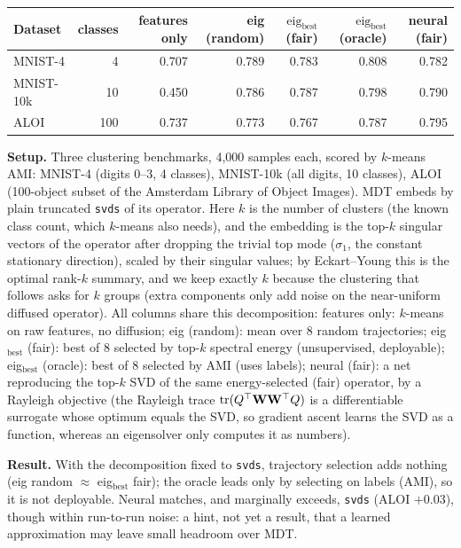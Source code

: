 \begingroup\centering\footnotesize
\begin{tabular}{l r r r r r r}
\toprule
Dataset & classes & features only & eig (random) & $\text{eig}_{\text{best}}$ (fair) & $\text{eig}_{\text{best}}$ (oracle) & neural (fair)\\
\midrule
MNIST-4   & 4   & 0.707 & 0.789 & 0.783 & 0.808 & 0.782\\
MNIST-10k & 10  & 0.450 & 0.786 & 0.787 & 0.798 & 0.790\\
ALOI      & 100 & 0.737 & 0.773 & 0.767 & 0.787 & 0.795\\
\bottomrule
\end{tabular}
\par\endgroup
\medskip

\noindent\textbf{Setup.} Three clustering benchmarks, 4{,}000 samples each, scored by
$k$-means AMI: MNIST-4 (digits 0--3, 4 classes), MNIST-10k (all digits, 10 classes), ALOI
(100-object subset of the Amsterdam Library of Object Images). MDT embeds by plain truncated
\texttt{svds} of its operator. Here $k$ is the number of clusters (the known class count, which
$k$-means also needs), and the embedding is the top-$k$ singular vectors of the operator after dropping
the trivial top mode ($\sigma_1$, the constant stationary direction), scaled by their singular values;
by Eckart--Young this is the optimal rank-$k$ summary, and we keep exactly $k$ because the clustering
that follows asks for $k$ groups (extra components only add noise on the near-uniform diffused operator).
All columns share this decomposition: features only: $k$-means
on raw features, no diffusion; eig (random): mean over 8 random trajectories;
eig$_{\text{best}}$ (fair): best of 8 selected by top-$k$ spectral energy (unsupervised,
deployable); eig$_{\text{best}}$ (oracle): best of 8 selected by AMI (uses labels);
neural (fair): a net reproducing the top-$k$ SVD of the same energy-selected (fair) operator,
by a Rayleigh objective (the Rayleigh trace $\operatorname{tr}(Q^{\top}\mathbf{W}\mathbf{W}^{\top}Q)$ is a differentiable
surrogate whose optimum equals the SVD, so gradient ascent learns the SVD as a function, whereas
an eigensolver only computes it as numbers).

\noindent\textbf{Result.} With the decomposition fixed to \texttt{svds}, trajectory selection adds
nothing (eig random $\approx$ eig$_{\text{best}}$ fair); the oracle leads only by selecting on labels
(AMI), so it is not deployable. Neural matches, and marginally exceeds, \texttt{svds} (ALOI $+0.03$),
though within run-to-run noise: a hint, not yet a result, that a learned approximation may leave small
headroom over MDT.
